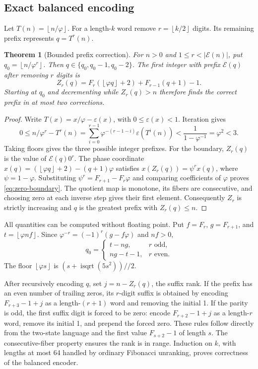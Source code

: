 \documentclass[11pt]{article}
\newtheorem{theorem}{Theorem}[section]
\theoremstyle{definition}\newtheorem{definition}[theorem]{Definition}
\newcommand{\ph}{\varphi}
\newcommand{\fl}[1]{\left\lfloor #1\right\rfloor}
\newcommand{\E}{\mathcal E}
\begin{document}
\subsection{Exact balanced encoding}
Let $T(n)=\fl{n/\ph}$. For a length-$k$ word remove $r=\fl{k/2}$
digits. Its remaining prefix represents $q=T^r(n)$.
\begin{theorem}[Bounded prefix correction]
For $n>0$ and $1\le r<|\E(n)|$, put $q_0=\fl{n/\ph^r}$. Then
$q\in\{q_0,q_0-1,q_0-2\}$. The first integer with prefix $\E(q)$
after removing $r$ digits is
\begin{equation}\label{eq:zero-boundary}
 Z_r(q)=F_r(\fl{\ph q}+2)+F_{r-1}(q+1)-1.
\end{equation}
Starting at $q_0$ and decrementing while $Z_r(q)>n$ therefore finds the
correct prefix in at most two corrections.
\end{theorem}
\begin{proof}
Write $T(x)=x/\ph-\varepsilon(x)$, with $0\le\varepsilon(x)<1$.
Iteration gives
\[
0\le n/\ph^r-T^r(n)
 =\sum_{i=0}^{r-1}\ph^{-(r-1-i)}\varepsilon(T^i(n))
 <\frac1{1-\ph^{-1}}=\ph^2<3.
\]
Taking floors gives the three possible integer prefixes.
For the boundary, $Z_r(q)$ is the value of $\E(q)0^r$.
The phase coordinate
$x(q)=(\fl{\ph q}+2)-(q+1)\ph$ satisfies
$x(Z_r(q))=\psi^rx(q)$, where $\psi=1-\ph$.
Substituting $\psi^r=F_{r+1}-F_r\ph$ and comparing coefficients
of $\ph$ proves \eqref{eq:zero-boundary}.
The quotient map is monotone, its fibers are consecutive, and choosing
zero at each inverse step gives their first element. Consequently $Z_r$
is strictly increasing and $q$ is the greatest prefix with $Z_r(q)\le n$.
\end{proof}
All quantities can be computed without floating point. Put $f=F_r$,
$g=F_{r+1}$, and $t=\fl{\ph nf}$. Since
$\ph^{-r}=(-1)^r(g-f\ph)$ and $nf>0$,
\[
 q_0=\begin{cases}t-ng,&r\text{ odd},\\ng-t-1,&r\text{ even}.
 \end{cases}
\]
The floor $\fl{\ph s}$ is $(s+\operatorname{isqrt}(5s^2))\mathbin{//}2$.

After recursively encoding $q$, set $j=n-Z_r(q)$, the suffix rank.
If the prefix has an even number of trailing zeros, its $r$-digit suffix
is obtained by encoding $F_{r+3}-1+j$ as a length-$(r+1)$ word and
removing the initial 1. If the parity is odd, the first suffix digit is
forced to be zero: encode $F_{r+2}-1+j$ as a length-$r$ word, remove
its initial 1, and prepend the forced zero. These rules follow directly
from the two-state language and the first value $F_{s+2}-1$ of length
$s$. The consecutive-fiber property ensures the rank is in range.
Induction on $k$, with lengths at most 64 handled by ordinary Fibonacci
unranking, proves correctness of the balanced encoder.
\end{document}
